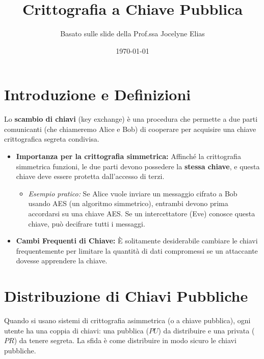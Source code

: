

\title{Crittografia a Chiave Pubblica}
\author{Basato sulle slide della Prof.ssa Jocelyne Elias}
\date{\today}



\maketitle
\tableofcontents
\newpage

\section{Introduzione e Definizioni}

Lo \textbf{scambio di chiavi} (key exchange) è una procedura che permette a due parti comunicanti (che chiameremo Alice e Bob) di cooperare per acquisire una chiave crittografica segreta condivisa.

\begin{itemize}
    \item \textbf{Importanza per la crittografia simmetrica:} Affinché la crittografia simmetrica funzioni, le due parti devono possedere la \textbf{stessa chiave}, e questa chiave deve essere protetta dall'accesso di terzi.
        \begin{itemize}
            \item \textit{Esempio pratico:} Se Alice vuole inviare un messaggio cifrato a Bob usando AES (un algoritmo simmetrico), entrambi devono prima accordarsi su una chiave AES. Se un intercettatore (Eve) conosce questa chiave, può decifrare tutti i messaggi.
        \end{itemize}
    \item \textbf{Cambi Frequenti di Chiave:} È solitamente desiderabile cambiare le chiavi frequentemente per limitare la quantità di dati compromessi se un attaccante dovesse apprendere la chiave.
\end{itemize}

\section{Distribuzione di Chiavi Pubbliche}
Quando si usano sistemi di crittografia asimmetrica (o a chiave pubblica), ogni utente ha una coppia di chiavi: una pubblica ($PU$) da distribuire e una privata ($PR$) da tenere segreta. La sfida è come distribuire in modo sicuro le chiavi pubbliche.

